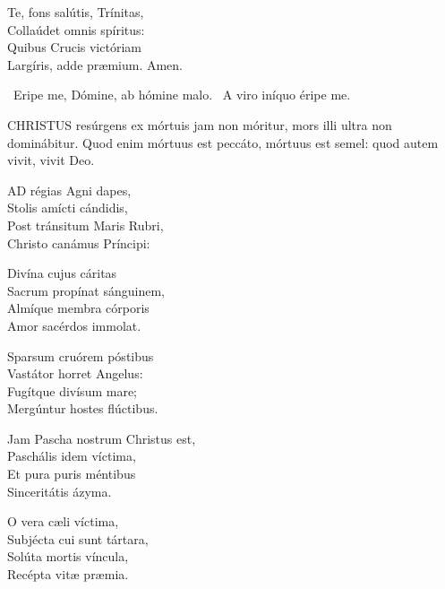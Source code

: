 Te, fons salútis, Trínitas,\\
Collaúdet omnis spíritus:\\
Quibus Crucis victóriam\\
Largíris, adde præmium. Amen.

\V\ Eripe me, Dómine, ab hómine malo. \R\ A viro iníquo éripe me.





\lettrine[lines=2]{C}{HRISTUS} resúrgens ex mórtuis jam non móritur, mors illi ultra non dominábitur. Quod enim mórtuus est peccáto, mórtuus est semel: quod autem vivit, vivit Deo.



\lettrine[lines=2]{A}{D} régias Agni dapes,\\
Stolis amícti cándidis,\\
Post tránsitum Maris Rubri,\\
Christo canámus Príncipi:

Divína cujus cáritas\\
Sacrum propínat sánguinem,\\
Almíque membra córporis\\
Amor sacérdos immolat.

Sparsum cruórem póstibus\\
Vastátor horret Angelus:\\
Fugítque divísum mare;\\
Mergúntur hostes flúctibus.

Jam Pascha nostrum Christus est,\\
Paschális idem víctima,\\
Et pura puris méntibus\\
Sinceritátis ázyma.

O vera cæli víctima,\\
Subjécta cui sunt tártara,\\
Solúta mortis víncula,\\
Recépta vitæ præmia.

